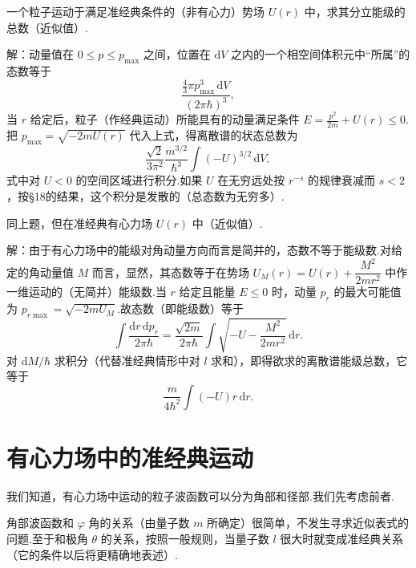 \begin{xiti}

\quad 一个粒子运动于满足准经典条件的（非有心力）势场 $U(r)$ 中，求其分立能级的总数（近似值）.

解：动量值在 $0\leqslant p\leqslant p_{\max}$ 之间，位置在 $\mathrm{d}V$ 之内的一个相空间体积元中“所属”的态数等于
\begin{equation*}
  \frac{\frac{4}{3}\pi p_{\max}^3\,\mathrm{d}V}{(2\pi\hbar)^3},
\end{equation*}
当 $r$ 给定后，粒子（作经典运动）所能具有的动量满足条件 $E=\frac{p^2}{2m}+U(r)\leqslant0$.把 $p_{\max}=\sqrt{-2mU(r)}$ 代入上式，得离散谱的状态总数为
\begin{equation*}
  \frac{\sqrt{2}}{3\pi^2}\frac{m^{3/2}}{\hbar^3}\int(-U)^{3/2}\,\mathrm{d}V,
\end{equation*}
式中对 $U<0$ 的空间区域进行积分.如果 $U$ 在无穷远处按 $r^{-s}$ 的规律衰减而 $s<2$，按§18的结果，这个积分是发散的（总态数为无穷多）.

\quad 同上题，但在准经典有心力场 $U(r)$ 中（近似值）.

解：由于有心力场中的能级对角动量方向而言是简并的，态数不等于能级数.对给定的角动量值 $M$ 而言，显然，其态数等于在势场 $U_M(r)=U(r)+\dfrac{M^2}{2mr^2}$ 中作一维运动的（无简并）能级数.当 $r$ 给定且能量 $E\leqslant0$ 时，动量 $p_r$ 的最大可能值为 $p_{r\max}=\sqrt{-2mU_M}$.故态数（即能级数）等于
\begin{equation*}
  \int\frac{\mathrm{d}r\,\mathrm{d}p_r}{2\pi\hbar}
  =\frac{\sqrt{2m}}{2\pi\hbar}\int\sqrt{-U-\frac{M^2}{2mr^2}}\,\mathrm{d}r.
\end{equation*}
对 $\mathrm{d}M/\hbar$ 求积分（代替准经典情形中对 $l$ 求和），即得欲求的离散谱能级总数，它等于
\begin{equation*}
  \frac{m}{4\hbar^2}\int(-U)r\,\mathrm{d}r.
\end{equation*}

\end{xiti}

\section{有心力场中的准经典运动}

我们知道，有心力场中运动的粒子波函数可以分为角部和径部.我们先考虑前者.

角部波函数和 $\varphi$ 角的关系（由量子数 $m$ 所确定）很简单，不发生寻求近似表式的问题.至于和极角 $\theta$ 的关系，按照一般规则，当量子数 $l$ 很大时就变成准经典关系（它的条件以后将更精确地表述）.

